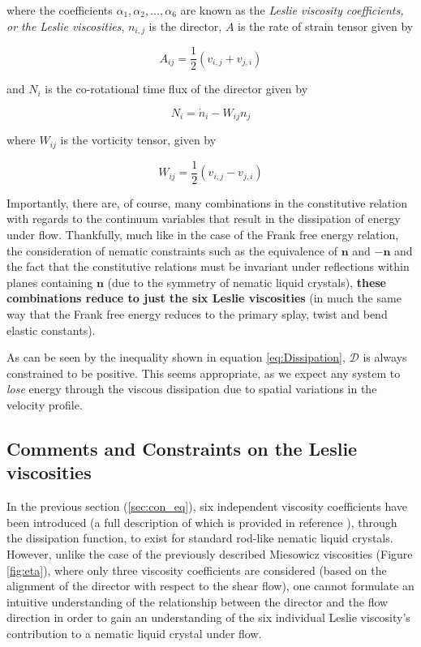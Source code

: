 \noindent where the coefficients $\alpha_1,\alpha_2,...,\alpha_6$ are known as the \textit{Leslie viscosity coefficients, or the Leslie viscosities}, $n_{i,j}$ is the director, $A$ is the rate of strain tensor given by

\begin{equation}
A_{ij}=\frac{1}{2}\left(v_{i,j}+v_{j,i}\right)
\end{equation}

\noindent and $N_i$ is the co-rotational time flux of the director given by

\begin{equation}
N_i=\dot{n}_i-W_{ij}n_j
\end{equation}

\noindent where $W_{ij}$ is the vorticity tensor, given by

\begin{equation}
W_{ij}=\frac{1}{2}\left(v_{i,j}-v_{j,i}\right)
\end{equation}

Importantly, there are, of course, many combinations in the constitutive relation with regards to the continuum variables that result in the dissipation of energy under flow. Thankfully, much like in the case of the Frank free energy relation, the consideration of nematic constraints such as the equivalence of $\mathbf{n}$ and $-\mathbf{n}$ and the fact that the constitutive relations must be invariant under reflections within planes containing $\mathbf{n}$ (due to the symmetry of nematic liquid crystals), \textbf{these combinations reduce to just the six Leslie viscosities} (in much the same way that the Frank free energy reduces to the primary splay, twist and bend elastic constants).

As can be seen by the inequality shown in equation \ref{eq:Dissipation}, $\mathcal{D}$ is always constrained to be positive. This seems appropriate, as we expect any system to \textit{lose} energy through the viscous dissipation due to spatial variations in the velocity profile. 

\subsection{Comments and Constraints on the Leslie viscosities}
In the previous section (\ref{sec:con_eq}), six independent viscosity coefficients have been introduced (a full description of which is provided in reference \cite{Stewart2004}), through the dissipation function, to exist for standard rod-like nematic liquid crystals. However, unlike the case of the previously described Miesowicz viscosities (Figure \ref{fig:eta}), where only three viscosity coefficients are considered (based on the alignment of the director with respect to the shear flow), one cannot formulate an intuitive understanding of the relationship between the director and the flow direction in order to gain an understanding of the six individual Leslie viscosity's contribution to a nematic liquid crystal under flow.

